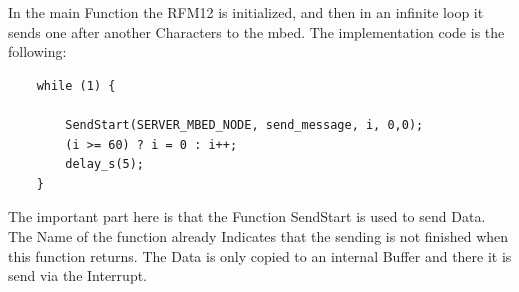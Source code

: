 In the main Function the RFM12 is initialized, and then in an infinite loop it sends one after another Characters to the mbed. The implementation code is the following: 

\begin{lstlisting}
	while (1) {

		SendStart(SERVER_MBED_NODE, send_message, i, 0,0);
	    (i >= 60) ? i = 0 : i++;
	    delay_s(5);
	}
\end{lstlisting}

The important part here is that the Function SendStart is used to send Data. The Name of the function already Indicates that the sending is not finished when this function returns. The Data is only copied to an internal Buffer and there it is send via the Interrupt. 
